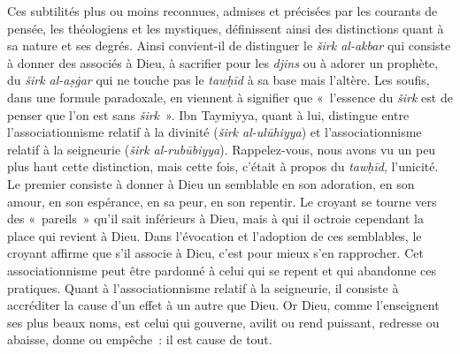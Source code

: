 Ces subtilités plus ou moins reconnues, admises et précisées par les
courants de pensée, les théologiens et les mystiques, définissent ainsi
des distinctions quant à sa nature et ses degrés. Ainsi convient-il de
distinguer le \emph{širk al-akbar} qui consiste à donner des associés à
Dieu, à sacrifier pour les \emph{djins} ou à adorer un prophète, du
\emph{širk al-aṣġar} qui ne touche pas le \emph{tawḥīd} à sa base mais
l'altère. Les soufis, dans une formule paradoxale, en viennent à
signifier que «~l'essence du \emph{širk} est de penser que l'on est sans
\emph{širk}~». Ibn
Taymiyya, quant à lui, distingue entre l'associationnisme relatif à la
divinité (\emph{širk al-ulūhiyya}) et l'associationnisme relatif à la
seigneurie (\emph{širk al-rubūbiyya}). Rappelez-vous, nous avons vu un peu plus
haut cette distinction, mais cette fois, c'était à propos du
\emph{tawḥīd}, l'unicité. Le premier consiste à donner à Dieu un
semblable en son adoration, en son amour, en son espérance, en sa peur,
en son repentir. Le croyant se tourne vers des «~pareils~» qu'il sait
inférieurs à Dieu, mais à qui il octroie cependant la place qui revient
à Dieu. Dans l'évocation et l'adoption de ces semblables, le croyant
affirme que s'il associe à Dieu, c'est pour mieux s'en rapprocher. Cet
associationnisme peut être pardonné à celui qui se repent et qui
abandonne ces pratiques. Quant à l'associationnisme relatif à la
seigneurie, il consiste à accréditer la cause d'un effet à un autre que
Dieu. Or Dieu, comme l'enseignent ses plus beaux noms, est celui qui
gouverne, avilit ou rend puissant, redresse ou abaisse, donne ou
empêche~: il est cause de tout.

